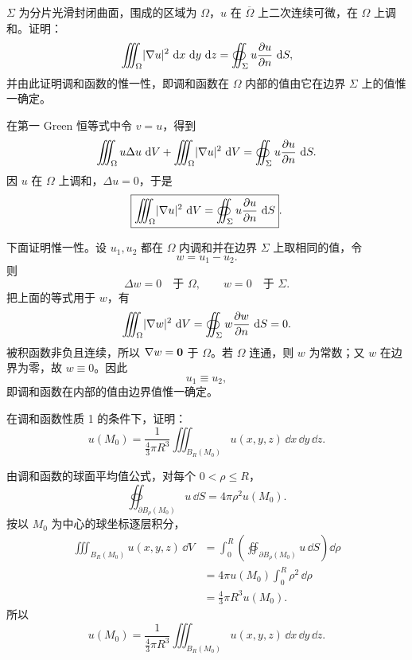 \begin{xexercise}[3]
$\Sigma$ 为分片光滑封闭曲面，围成的区域为 $\Omega$，$u$ 在 $\overline\Omega$ 上二次连续可微，在 $\Omega$ 上调和。证明：
\[
  \iiint_\Omega\lvert\nabla u\rvert^2\,\mathop{}\!\mathrm{d} x\,\mathop{}\!\mathrm{d} y\,\mathop{}\!\mathrm{d} z
  =\oiint_\Sigma u\frac{\partial u}{\partial n}\,\mathop{}\!\mathrm{d} S,
\]
并由此证明调和函数的惟一性，即调和函数在 $\Omega$ 内部的值由它在边界 $\Sigma$ 上的值惟一确定。
\end{xexercise}
\begin{xsolution}
在第一 Green 恒等式中令 $v=u$，得到
\[
  \iiint_\Omega u\Delta u\,\mathop{}\!\mathrm{d} V
  +\iiint_\Omega\lvert\nabla u\rvert^2\,\mathop{}\!\mathrm{d} V
  =\oiint_\Sigma u\frac{\partial u}{\partial n}\,\mathop{}\!\mathrm{d} S.
\]
因 $u$ 在 $\Omega$ 上调和，$\Delta u=0$，于是
\[
  \boxed{
  \iiint_\Omega\lvert\nabla u\rvert^2\,\mathop{}\!\mathrm{d} V
  =\oiint_\Sigma u\frac{\partial u}{\partial n}\,\mathop{}\!\mathrm{d} S
  }.
\]

下面证明惟一性。设 $u_1,u_2$ 都在 $\Omega$ 内调和并在边界 $\Sigma$ 上取相同的值，令
\[
  w=u_1-u_2.
\]
则
\[
  \Delta w=0\quad\text{于 }\Omega,
  \qquad
  w=0\quad\text{于 }\Sigma.
\]
把上面的等式用于 $w$，有
\[
  \iiint_\Omega\lvert\nabla w\rvert^2\,\mathop{}\!\mathrm{d} V
  =\oiint_\Sigma w\frac{\partial w}{\partial n}\,\mathop{}\!\mathrm{d} S=0.
\]
被积函数非负且连续，所以 $\nabla w=\bm{0}$ 于 $\Omega$。若 $\Omega$ 连通，则 $w$ 为常数；又 $w$ 在边界为零，故 $w\equiv0$。因此
\[
  u_1\equiv u_2,
\]
即调和函数在内部的值由边界值惟一确定。
\end{xsolution}


\begin{xexercise}[4]
在调和函数性质 1 的条件下，证明：
\[
  u(M_0)=\frac{1}{\frac43\pi R^3}\iiint_{B_R(M_0)}u(x,y,z)\,\dd x\,\dd y\,\dd z.
\]
\end{xexercise}
\begin{xsolution}
由调和函数的球面平均值公式，对每个 $0<\rho\le R$，
\[
  \oiint_{\partial B_\rho(M_0)}u\,\dd S
  =4\pi\rho^2u(M_0).
\]
按以 $M_0$ 为中心的球坐标逐层积分，
\begin{align*}
  \iiint_{B_R(M_0)}u(x,y,z)\,\dd V
  &=\int_0^R\left(
    \oiint_{\partial B_\rho(M_0)}u\,\dd S
    \right)\dd\rho\\
  &=4\pi u(M_0)\int_0^R\rho^2\,\dd\rho\\
  &=\frac{4}{3}\pi R^3u(M_0).
\end{align*}
所以
\[
  \boxed{
  u(M_0)=\frac{1}{\frac43\pi R^3}
  \iiint_{B_R(M_0)}u(x,y,z)\,\dd x\,\dd y\,\dd z
  }.
\]
\end{xsolution}


